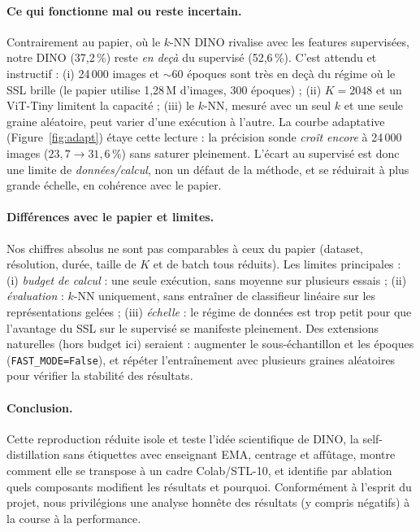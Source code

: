 \documentclass[11pt,a4paper]{article}
\begin{document}
\paragraph{Ce qui fonctionne mal ou reste incertain.} Contrairement au papier, où le $k$-NN DINO
rivalise avec les features supervisées, notre DINO (37,2\,\%) reste \emph{en deçà} du supervisé
(52,6\,\%). C'est attendu et instructif : (i) 24\,000 images et $\sim$60 époques sont très en deçà
du régime où le SSL brille (le papier utilise 1,28\,M d'images, 300 époques) ; (ii) $K=2048$ et un
ViT-Tiny limitent la capacité ; (iii) le $k$-NN, mesuré avec un seul $k$ et une seule graine
aléatoire, peut varier d'une exécution à l'autre. La courbe adaptative (Figure~\ref{fig:adapt}) étaye cette lecture : la précision sonde
\emph{croît encore} à 24\,000 images ($23{,}7\to31{,}6$\,\%) sans saturer pleinement. L'écart au
supervisé est donc une limite de \emph{données/calcul}, non un défaut de la méthode, et se
réduirait à plus grande échelle, en cohérence avec le papier.

\paragraph{Différences avec le papier et limites.} Nos chiffres absolus ne sont pas comparables à
ceux du papier (dataset, résolution, durée, taille de $K$ et de batch tous réduits). Les limites
principales : (i) \emph{budget de calcul} : une seule exécution, sans moyenne sur plusieurs
essais ; (ii) \emph{évaluation} : $k$-NN uniquement, sans entraîner de classifieur linéaire sur
les représentations gelées ; (iii) \emph{échelle}
: le régime de données est trop petit pour que l'avantage du SSL sur le supervisé se manifeste
pleinement. Des extensions naturelles (hors budget ici) seraient : augmenter le sous-échantillon
et les époques (\texttt{FAST\_MODE=False}), et répéter l'entraînement avec plusieurs graines
aléatoires pour vérifier la stabilité des résultats.

\paragraph{Conclusion.} Cette reproduction réduite isole et teste l'idée scientifique de DINO,
la self-distillation sans étiquettes avec enseignant EMA, centrage et affûtage, montre comment
elle se transpose à un cadre Colab/STL-10, et identifie par ablation quels composants modifient
les résultats et pourquoi. Conformément à l'esprit du projet, nous privilégions une analyse
honnête des résultats (y compris négatifs) à la course à la performance.
\end{document}
